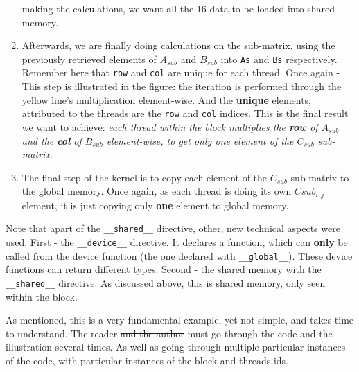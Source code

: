 \begin{enumerate}
   making the calculations, we want all the 16 data to be loaded into shared memory.
   \item Afterwards, we are finally doing calculations on the sub-matrix, using the previously retrieved elements of $A_{sub}$ and $B_{sub}$ into \verb|As| and \verb|Bs| respectively.
   Remember here that \verb|row| and \verb|col| are unique for each thread. Once again - This step is illustrated in the figure: the iteration is performed through the yellow 
   line's multiplication element-wise. And the \textbf{unique} elements, attributed to the threads are the \verb|row| and \verb|col| indices. This is the final result 
   we want to achieve: \textit{each thread within the block multiplies the \textbf{row} of $A_{sub}$ and the \textbf{col} of $B_{sub}$ element-wise, to get only one element of the $C_{sub}$ sub-matrix}.
   \item The final step of the kernel is to copy each element of the $C_{sub}$ sub-matrix to the global memory. Once again, 
   as each thread is doing its own $Csub_{i,j}$ element, it is just copying only \textbf{one} element to global memory.   
\end{enumerate}
   Note that apart of the \verb|__shared__| directive, other, new technical aspects were used. First - the \verb|__device__| directive.
   It declares a function, which can \textbf{only} be called from the device function (the one declared with \verb|__global__|). These device functions 
   can return different types. Second - the shared memory with the \verb|__shared__| directive. As discussed above, this is shared memory, only seen within the block.
    

   As mentioned, this is a very fundamental example, yet not simple, and takes time to understand. The reader \sout{and the author} must go through the code 
   and the illustration several times. As well as going through multiple particular instances of the code, with particular instances of the block and threads ids.


